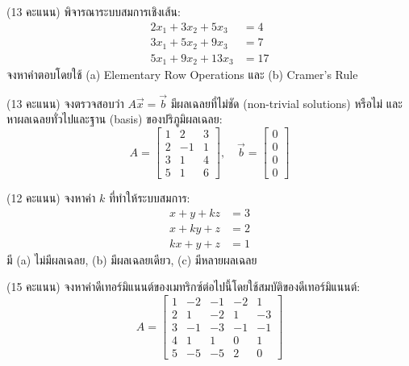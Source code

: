 ﻿\documentclass[12pt, a4paper]{exam}
\begin{document}
\begin{questions}
\question (13 คะแนน) พิจารณาระบบสมการเชิงเส้น:
\[
\begin{aligned}
2x_1 + 3x_2 + 5x_3 &= 4 \\
3x_1 + 5x_2 + 9x_3 &= 7 \\
5x_1 + 9x_2 + 13x_3 &= 17
\end{aligned}
\]
จงหาคำตอบโดยใช้ (a) Elementary Row Operations และ (b) Cramer's Rule
\vspace{5cm}

\question (13 คะแนน) จงตรวจสอบว่า $A\vec{x} = \vec{b}$ มีผลเฉลยที่ไม่ชัด (non-trivial solutions) \mbox{หรือไม่} และหาผลเฉลยทั่วไปและฐาน (basis) ของปริภูมิผลเฉลย:
\[
A = \begin{bmatrix} 1 & 2 & 3 \\ 2 & -1 & 1 \\ 3 & 1 & 4 \\ 5 & 1 & 6 \end{bmatrix}, \quad \vec{b} = \begin{bmatrix} 0 \\ 0 \\ 0 \\ 0 \end{bmatrix}
\]
\vspace{5cm}

\question (12 คะแนน) จงหาค่า $k$ ที่ทำให้ระบบสมการ:
\[
\begin{aligned}
x + y + kz &= 3 \\
x + ky + z &= 2 \\
kx + y + z &= 1
\end{aligned}
\]
มี (a) ไม่มีผลเฉลย, (b) มีผลเฉลยเดียว, (c) มีหลายผลเฉลย
\vspace{5cm}

\question (15 คะแนน) จงหาค่าดีเทอร์มิแนนต์ของเมทริกซ์ต่อไปนี้โดยใช้สมบัติของดีเทอร์มิแนนต์:
\[
A = \begin{bmatrix} 1 & -2 & -1 & -2 & 1 \\ 2 & 1 & -2 & 1 & -3 \\ 3 & -1 & -3 & -1 & -1 \\ 4 & 1 & 1 & 0 & 1 \\ 5 & -5 & -5 & 2 & 0 \end{bmatrix}
\]
\vspace{5cm}

\end{questions}
\end{document}
